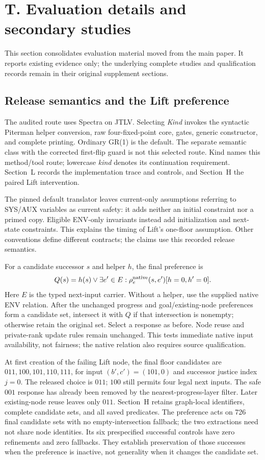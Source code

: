 \section*{T. Evaluation details and secondary studies}
\label{supp:v64-evaluation-details}
This section consolidates evaluation material moved from the main paper.
It reports existing evidence only; the underlying complete studies and
qualification records remain in their original supplement sections.

\subsection*{Release semantics and the Lift preference}
The audited route uses Spectra  on JTLV.
Selecting \emph{Kind} invokes the syntactic Piterman helper conversion,
raw four-fixed-point core, gates, generic constructor, and complete
printing. Ordinary GR(1) is the default. The separate semantic class
with the corrected first-flip guard is not this selected route.
Kind names this method/tool route; lowercase \emph{kind} denotes its
continuation requirement. Section~L records the implementation trace
and controls, and Section~H the paired Lift intervention.

The pinned default translator leaves current-only assumptions referring
to SYS/AUX variables as current safety: it adds neither an initial
constraint nor a primed copy. Eligible ENV-only invariants instead add
initialization and next-state constraints. This explains the timing of
Lift's one-floor assumption. Other conventions define different
contracts; the claims use this recorded release semantics.

For a candidate successor $s$ and helper $h$, the final preference is
\[
 Q(s)=h(s)\lor\exists e'\in E:\rho_e^{\rm native}(s,e')[h=0,h'=0].
\]
Here $E$ is the typed next-input carrier. Without a helper, use the
supplied native ENV relation. After the unchanged progress and
goal/existing-node preferences form a candidate set, intersect it with
$Q$ if that intersection is nonempty; otherwise retain the original
set. Select a response as before. Node reuse and private-rank update
rules remain unchanged. This tests immediate native input availability,
not fairness; the native relation also requires source qualification.

At first creation of the failing Lift node, the final floor candidates
are $011,100,101,110,111$, for input $(b',c')=(101,0)$ and successor
justice index $j=0$. The released choice is $011$; $100$ still permits
four legal next inputs. The safe $001$ response has already been removed
by the nearest-progress-layer filter. Later existing-node reuse leaves
only $011$. Section~H retains graph-local identifiers, complete candidate
sets, and all saved predicates. The preference acts on 726 final
candidate sets with no empty-intersection fallback; the two extractions
need not share node identities. Its six prespecified successful controls
have zero refinements and zero fallbacks. They establish preservation of
those successes when the preference is inactive, not generality when
it changes the candidate set.

